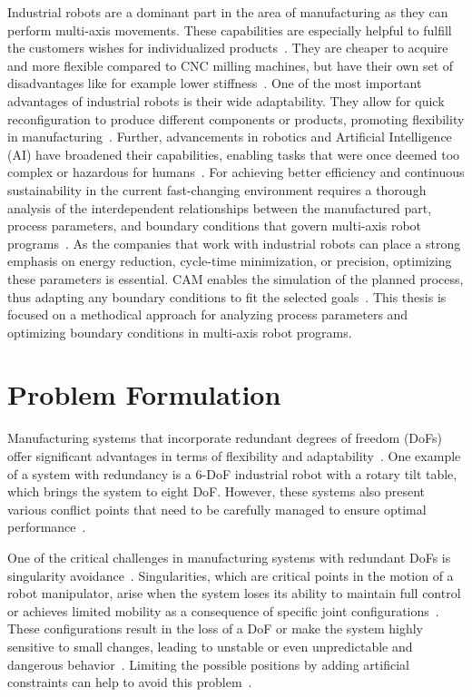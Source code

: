Industrial robots are a dominant part in the area of manufacturing as they can perform multi-axis movements. These capabilities are especially helpful to fulfill the customers wishes for individualized products~\cite{Sherwani.2020}. They are cheaper to acquire and more flexible compared to \acrshort{CNC} milling machines, but have their own set of disadvantages like for example lower stiffness~\cite{Iglesias.2015, Liberman.2021}. One of the most important advantages of industrial robots is their wide adaptability. They allow for quick reconfiguration to produce different components or products, promoting flexibility in manufacturing~\cite{Billard.2019}. Further, advancements in robotics and Artificial Intelligence (\acrshort{AI}) have broadened their capabilities, enabling tasks that were once deemed too complex or hazardous for humans~\cite{Goel.2020}. 
For achieving better efficiency and continuous sustainability in the current fast-changing environment requires a thorough analysis of the interdependent relationships between the manufactured part, process parameters, and boundary conditions that govern multi-axis robot programs~\cite{Pan, Gadaleta.2019}. As the companies that work with industrial robots can place a strong emphasis on energy reduction, cycle-time minimization, or precision, optimizing these parameters is essential. \acrshort{CAM} enables the simulation of the planned process, thus adapting any boundary conditions to fit the selected goals~\cite{Kyratsis.2020,Maiti.2017,Pan,Uhlmann.2016}.
This thesis is focused on a methodical approach for analyzing process parameters and optimizing boundary conditions in multi-axis robot programs. 

\section{Problem Formulation}\label{Problem Formulation}
Manufacturing systems that incorporate redundant degrees of freedom (\acrshort{DoF}s) offer significant advantages in terms of flexibility and adaptability~\cite{Anjum.2022}. One example of a system with redundancy is a 6-\acrshort{DoF} industrial robot with a rotary tilt table, which brings the system to eight \acrshort{DoF}. However, these systems also present various conflict points that need to be carefully managed to ensure optimal performance~\cite{Boscariol.2020, Wang.2022}.


One of the critical challenges in manufacturing systems with redundant \acrshort{DoF}s is singularity avoidance~\cite{ Kireanski.1993, Wang.2022}. Singularities, which are critical points in the motion of a robot manipulator, arise when the system loses its ability to maintain full control or achieves limited mobility as a consequence of specific joint configurations~\cite{Malyshev.2022}. These configurations result in the loss of a \acrshort{DoF} or make the system highly sensitive to small changes, leading to unstable or even unpredictable and dangerous behavior~\cite{Zhao.2021, Milenkovic.2021}. Limiting the possible positions by adding artificial constraints can help to avoid this problem~\cite{Faria.2018}. %

